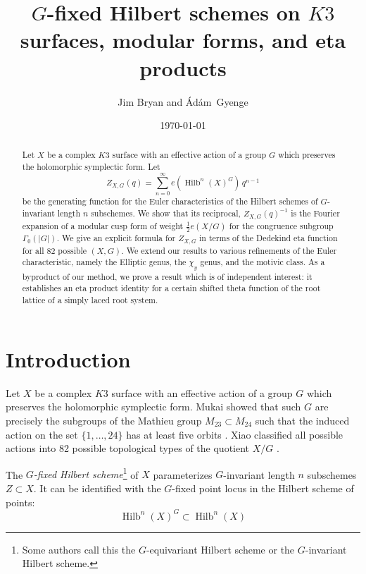 \documentclass{amsart}
\title{$G$-fixed Hilbert schemes on $K3$ surfaces, modular forms, and
eta products}
\author{Jim Bryan and { \'{A}d\'{a}m~Gyenge}}
\date{\today}
\theoremstyle{definition}
\newcommand{\half}{\frac{1}{2}}
\newcommand{\Hilb}{\operatorname{Hilb}}
\begin{document}

\begin{abstract}
Let $X$ be a complex $K3$ surface with an effective action of a group
$G$ which preserves the holomorphic symplectic form. Let 
\[
Z_{X,G}(q) = \sum_{n=0}^{\infty} e\left(\Hilb^{n}(X)^{G} \right)\, q^{n-1}
\]
be the generating function for the Euler characteristics of the
Hilbert schemes of $G$-invariant length $n$ subschemes. We show that
its reciprocal, $Z_{X,G}(q)^{-1}$ is the Fourier expansion of a
modular cusp form of weight $\half e(X/G)$ for the congruence subgroup
$\Gamma_{0}(|G|)$. We give an explicit formula for $Z_{X,G}$ in terms
of the Dedekind eta function for all 82 possible $(X,G)$.  We extend
our results to various refinements of the Euler characteristic, namely
the Elliptic genus, the $\chi_{y}$ genus, and the motivic class. As a
byproduct of our method, we prove a result which is of independent
interest: it establishes an eta product identity for a certain shifted
theta function of the root lattice of a simply laced root system.
\end{abstract}


\maketitle





\section{Introduction}

Let $X$ be a complex $K3$ surface with an effective action of a group
$G$ which preserves the holomorphic symplectic form. Mukai showed that
such $G$ are precisely the subgroups of the Mathieu group
$M_{23}\subset M_{24}$ such that the induced action on the set
$\{1,\dots ,24 \}$ has at least five orbits
\cite{mukai1988finite}. Xiao classified all possible actions into
82 possible topological types of the quotient $X/G$ \cite{xiao1996galois}.

The \emph{$G$-fixed Hilbert scheme}\footnote{Some authors call this
the $G$-equivariant Hilbert scheme or the $G$-invariant Hilbert
scheme.} of $X$ parameterizes $G$-invariant length $n$ subschemes
$Z\subset X$. It can be identified with the $G$-fixed point locus in
the Hilbert scheme of points:
\[
\Hilb^{n}(X)^{G} \subset \Hilb^{n}(X)
\]
\end{document}
